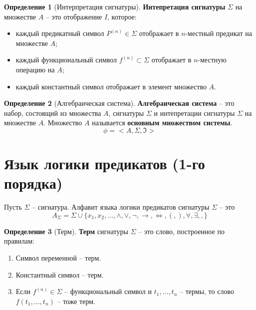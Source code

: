 \documentclass{report}
\theoremstyle{definition}
\newtheorem{definition}{Определение}[section]
\begin{document}
\begin{definition}[Интерпретация сигнатуры]
    \textbf{Интепретация сигнатуры} $\Sigma$ на множестве $A$ -- это отображение $I$, которое:
    \begin{itemize}
        \item каждый предикатный символ $P^{(n)} \in \Sigma$ отображает в $n$-местный предикат на множестве $A$;
        \item каждый функциональный символ $f^{(n)} \subset \Sigma$ отображает в $n$-местную операцию на $A$;
        \item каждый константный символ отображает в элемент множество $A$.
    \end{itemize}
\end{definition}

\begin{definition}[Алгебраическая система]
    \textbf{Алгебраическая система} -- это набор, состоящий из множества $A$, сигнатуры $\Sigma$ и интепретации сигнатуры $\Sigma$ на множестве $A$. Множество $A$ называется \textbf{основным множеством системы}.
    \begin{equation*}
        \phi = <A, \Sigma, \mathfrak{I}>
    \end{equation*}
\end{definition}

\section{Язык логики предикатов (1-го порядка)}

Пусть $\Sigma$ -- сигнатура. Алфавит языка логики предикатов сигнатуры $\Sigma$ -- это
\begin{equation*}
    A_\Sigma = \Sigma \cup \{x_1, x_2, \ldots, \land, \lor, \lnot, \rightarrow, \iff, (, ), \forall, \exists, ,\}
\end{equation*}

\begin{definition}[Терм]
    \textbf{Терм} сигнатуры $\Sigma$ -- это слово, построенное по правилам:
    \begin{enumerate}
        \item Символ переменной -- терм.
        \item Константный символ -- терм.
        \item Если $f^{(n)} \in \Sigma$ -- функциональный символ и $t_1,\ldots,t_n$ -- термы, то слово $f(t_1,\ldots,t_n)$ -- тоже терм.
    \end{enumerate}
\end{definition}
\end{document}
